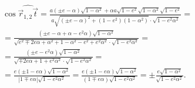 \begin{multline*}
	\cos \widehat{\vec r_{1, 2}  \vec t}
	= \frac{a ( \pm e - \alpha) \sqrt{1 - \alpha^2} + \alpha a \sqrt{1 - e^2} \sqrt{1 - \alpha^2} \sqrt{1 - e^2}}{a \sqrt{(\pm e - \alpha)^2 + (1 - e^2)(1 - \alpha^2)} \cdot \sqrt{1 - e^2 \alpha^2}} = \\
	= \frac{ (\pm e - \alpha + \alpha - e^2 \alpha) \sqrt{1 - \alpha^2}}{\sqrt{e^2 \mp 2 e\alpha + \alpha^2 + 1 - \alpha^2 - e^2 + e^2 \alpha^2} \cdot \sqrt{1 - e^2 \alpha^2}} = \\
	= \frac{ (\pm e - e^2 \alpha) \sqrt{1 - \alpha^2}}{\sqrt{\mp 2 e\alpha + 1  + e^2 \alpha^2} \cdot \sqrt{1 - e^2 \alpha^2}} = \\
	= \frac{ e(\pm 1 - e \alpha) \sqrt{1 - \alpha^2}}{|1 \mp e\alpha| \sqrt{1 - e^2 \alpha^2}}
	= \frac{ e(\pm 1 - e \alpha) \sqrt{1 - \alpha^2}}{(1 \mp e\alpha) \sqrt{1 - e^2 \alpha^2}}
	= \pm \frac{e \sqrt{1 - \alpha^2}}{\sqrt{1 - e^2 \alpha^2}}.
\end{multline*}

